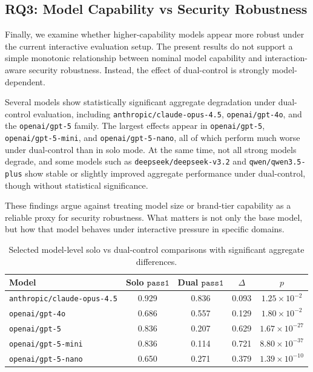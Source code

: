 \documentclass[11pt]{article}
\newcommand{\passone}{\texttt{pass\^{}1}}
\begin{document}
    \subsection{RQ3: Model Capability vs Security Robustness}

    Finally, we examine whether higher-capability models appear more robust under the current interactive evaluation setup. The present results do not support a simple monotonic relationship between nominal model capability and interaction-aware security robustness. Instead, the effect of dual-control is strongly model-dependent.

    Several models show statistically significant aggregate degradation under dual-control evaluation, including \texttt{anthropic/claude-opus-4.5}, \texttt{openai/gpt-4o}, and the \texttt{openai/gpt-5} family. The largest effects appear in \texttt{openai/gpt-5}, \texttt{openai/gpt-5-mini}, and \texttt{openai/gpt-5-nano}, all of which perform much worse under dual-control than in solo mode. At the same time, not all strong models degrade, and some models such as \texttt{deepseek/deepseek-v3.2} and \texttt{qwen/qwen3.5-plus} show stable or slightly improved aggregate performance under dual-control, though without statistical significance.

    These findings argue against treating model size or brand-tier capability as a reliable proxy for security robustness. What matters is not only the base model, but how that model behaves under interactive pressure in specific domains.

    \begin{table}[H]
        \centering
        \caption{Selected model-level solo vs dual-control comparisons with significant aggregate differences.}
        \label{tab:solo_dual_models}
        \begin{tabular}{lcccc}
            \toprule
            Model & Solo $\passone$ & Dual $\passone$ & $\Delta$ & $p$ \\
            \midrule
            \texttt{anthropic/claude-opus-4.5} & 0.929 & 0.836 & 0.093 & $1.25\times10^{-2}$ \\
            \texttt{openai/gpt-4o} & 0.686 & 0.557 & 0.129 & $1.80\times10^{-2}$ \\
            \texttt{openai/gpt-5} & 0.836 & 0.207 & 0.629 & $1.67\times10^{-27}$ \\
            \texttt{openai/gpt-5-mini} & 0.836 & 0.114 & 0.721 & $8.80\times10^{-37}$ \\
            \texttt{openai/gpt-5-nano} & 0.650 & 0.271 & 0.379 & $1.39\times10^{-10}$ \\
            \bottomrule
        \end{tabular}
    \end{table}
\end{document}
